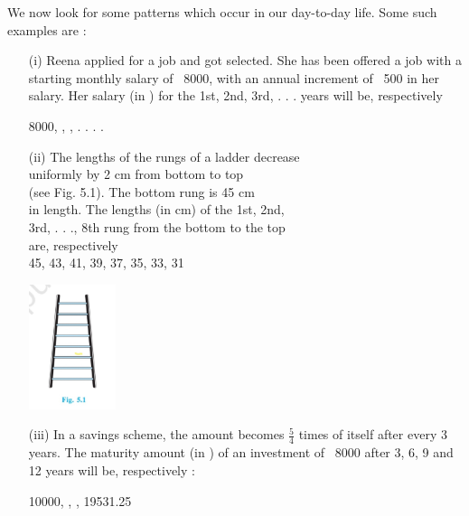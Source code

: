 \documentclass[12pt,a4paper]{book}
\begin{document}
We now look for some patterns which occur in our day-to-day life. Some such
examples are :
\begin{enumerate}
   

 \item [(i)] Reena applied for a job and got selected. She 
    has been offered a job with a starting monthly
    salary of  \ 8000, with an annual increment of
     \ 500 in her salary. Her salary (in  ) for the 1st,
    2nd, 3rd, . . . years will be, respectively
    
    \hspace{2cm} 8000, , , . . . .

 \item [(ii)] The lengths of the rungs of a ladder decrease
    \\ uniformly by 2 cm from bottom to top
     \\(see Fig. 5.1). The bottom rung is 45 cm\\ in
     length. The lengths (in cm) of the 1st, 2nd,
     \\3rd, . . ., 8th rung from the bottom to the top\\
     are, respectively\\
     
     \hspace{2cm} 45, 43, 41, 39, 37, 35, 33, 31

\vspace{-12em}\hspace{22em}\includegraphics[width=0.2\textwidth]{Ladder.png} 


\vspace{2cm} \item [(iii)] In a savings scheme, the amount becomes $\frac{5}{4}$ times of itself after every 3 years.
     The maturity amount (in  ) of an investment of  \ 8000 after 3, 6, 9 and 12 years
     will be, respectively :
     
     \hspace{2cm} 10000, , , 19531.25
     \end{enumerate}
\newpage
\end{document}
